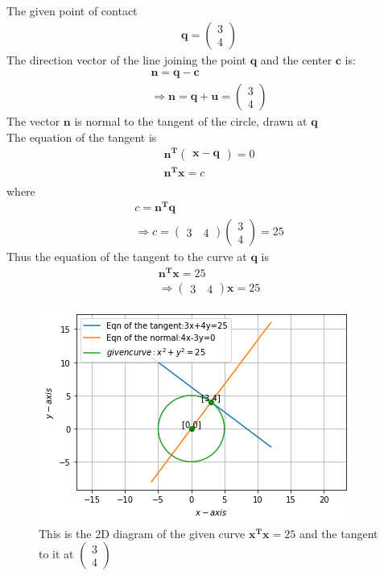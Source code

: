 \documentclass[journal,12pt,twocolumn]{IEEEtran}
\newcommand{\myvec}[1]{\ensuremath{\begin{pmatrix}#1\end{pmatrix}}}
\numberwithin{equation}{subsection}
\let\vec\mathbf
\begin{document}
The given point of contact
\begin{align}
 \vec{q}=\myvec{3\\4} \label{coord}  
\end{align}
The direction vector of the line joining the point $\vec{q}$ and the center $\vec{c}$ is:
\begin{align}
 \vec{n}= \vec{q}-\vec{c}\\
  \Longrightarrow\vec{n}= \vec{q}+\vec{u}=\myvec{3\\4}
\end{align}
The vector $\vec{n}$ is  normal to the tangent of the circle, drawn at $\vec{q}$\\
The equation of the tangent is
\begin{align}
 \vec{n^T}\myvec{\vec{x}-\vec{q}}=0\\
 \vec{n^T}\vec{x}=c\\
 \end{align}
 where 
 \begin{align}
c=\vec{n^T}\vec{q}\\
  \Longrightarrow c=\myvec{3\quad4}\myvec{3 \\4}=25
 \end{align}
Thus the equation of the tangent to the curve at $\vec{q}$ is
\begin{align}
    \vec{n^T}\vec{x}=25\\
     \Longrightarrow \myvec{3\quad4}\vec{x}=25
\end{align}

\begin{figure}[!]
 \begin{center}
  \includegraphics[width=\columnwidth]{assignment5_fig.png}
    \caption{This is the 2D diagram of the given curve  $\vec{x^Tx}=25$ and the tangent to it at $\myvec{3\\4}$}
    \label{myfig:1}
    \end{center}
\end{figure}
\end{document}
